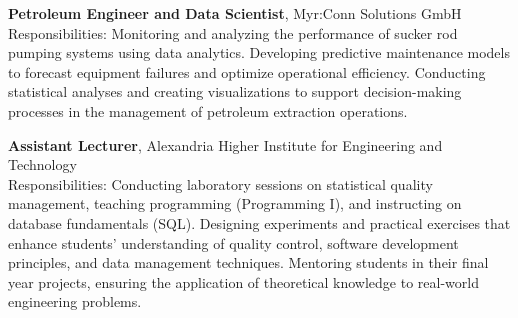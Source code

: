 \documentclass[a4paper,10pt]{article}
\begin{document}
\begin{description}[style=nextline, leftmargin=0.5cm]
    \item[Jul 2018 – Jun 2019] \textbf{Petroleum Engineer and Data Scientist}, Myr:Conn Solutions GmbH \\
    Responsibilities: Monitoring and analyzing the performance of sucker rod pumping systems using data analytics. Developing predictive maintenance models to forecast equipment failures and optimize operational efficiency. Conducting statistical analyses and creating visualizations to support decision-making processes in the management of petroleum extraction operations.
    
    \item[Feb 2018 - Jun 2019] \textbf{Assistant Lecturer}, Alexandria Higher Institute for Engineering and Technology \\
    Responsibilities: Conducting laboratory sessions on statistical quality management, teaching programming (Programming I), and instructing on database fundamentals (SQL). Designing experiments and practical exercises that enhance students' understanding of quality control, software development principles, and data management techniques. Mentoring students in their final year projects, ensuring the application of theoretical knowledge to real-world engineering problems.
    
\end{description}

\clearpage
\end{document}
